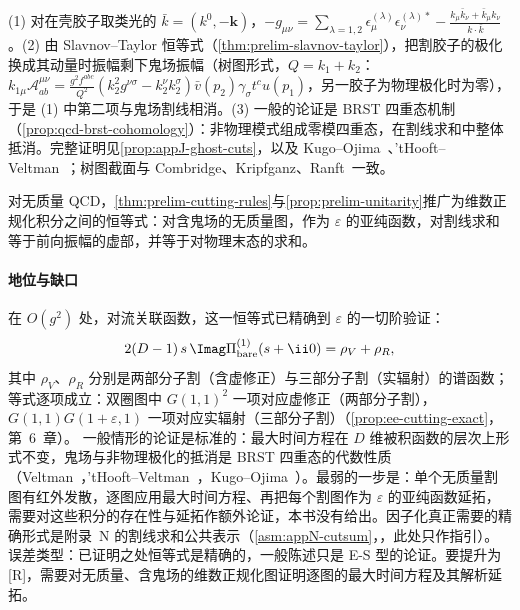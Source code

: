 \begin{proofsketch}
(1) 对在壳胶子取类光的 $\bar k=(k^0,-\mathbf k)$，$-g_{\mu\nu}=\sum_{\lambda=1,2}\epsilon^{(\lambda)}_\mu\epsilon^{(\lambda)*}_\nu-\frac{k_\mu\bar k_\nu+\bar k_\mu k_\nu}{k\cdot\bar k}$。(2) 由 Slavnov--Taylor 恒等式（\cref{thm:prelim-slavnov-taylor}），把割胶子的极化换成其动量时振幅剩下鬼场振幅（树图形式，$Q=k_1+k_2$：$k_{1\mu}\mathcal A^{\mu\nu}_{ab}=\frac{g^2f^{abc}}{Q^2}(k_2^2g^{\nu\sigma}-k_2^\nu k_2^\sigma)\bar v(p_2)\gamma_\sigma t^cu(p_1)$，另一胶子为物理极化时为零），于是 (1) 中第二项与鬼场割线相消。(3) 一般的论证是 BRST 四重态机制（\cref{prop:qcd-brst-cohomology}）：非物理模式组成零模四重态，在割线求和中整体抵消。完整证明见\cref{prop:appJ-ghost-cuts}，以及 Kugo--Ojima~\cite{KugoOjima1979}、'tHooft--Veltman~\cite{tHooftVeltman1972b}；树图截面与 Combridge、Kripfganz、Ranft~\cite{CombridgeKripfganzRanft1977}一致。
\end{proofsketch}

\begin{remark}\label{rem:prelim-cutting-dr}
对无质量 QCD，\cref{thm:prelim-cutting-rules}与\cref{prop:prelim-unitarity}推广为维数正规化积分之间的恒等式：对含鬼场的无质量图，作为 $\varepsilon$ 的亚纯函数，对割线求和等于前向振幅的虚部，并等于对物理末态的求和。
\end{remark}

\paragraph{地位与缺口}
在 $O(g^2)$ 处，对流关联函数，这一恒等式已精确到 $\varepsilon$ 的一切阶验证：
\[
2(D-1)\,s\,\Imag\Pi^{(1)}_{\mathrm{bare}}(s+\ii0)=\rho_V+\rho_R , %
\]
其中 $\rho_V$、$\rho_R$ 分别是两部分子割（含虚修正）与三部分子割（实辐射）的谱函数；等式逐项成立：双圈图中 $G(1,1)^2$ 一项对应虚修正（两部分子割），$G(1,1)G(1+\varepsilon,1)$ 一项对应实辐射（三部分子割）（\cref{prop:ee-cutting-exact}，第~6~章）。
一般情形的论证是标准的：最大时间方程在 $D$ 维被积函数的层次上形式不变，鬼场与非物理极化的抵消是 BRST 四重态的代数性质（Veltman~\cite{Veltman1963}，'tHooft--Veltman~\cite{tHooftVeltman1972b,tHooftVeltman1974}，Kugo--Ojima~\cite{KugoOjima1979}）。最弱的一步是：单个无质量割图有红外发散，逐图应用最大时间方程、再把每个割图作为 $\varepsilon$ 的亚纯函数延拓，需要对这些积分的存在性与延拓作额外论证，本书没有给出。因子化真正需要的精确形式是附录~N 的割线求和公共表示（\cref{asm:appN-cutsum}，\tagA，此处只作指引）。误差类型：已证明之处恒等式是精确的，一般陈述只是 E-S 型的论证。要提升为 [R]，需要对无质量、含鬼场的维数正规化图证明逐图的最大时间方程及其解析延拓。

